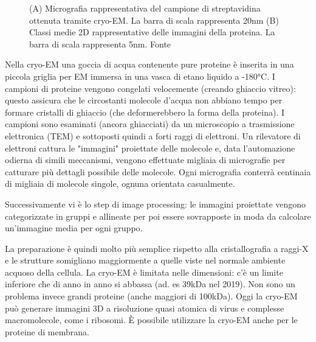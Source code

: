 {\begin{figure}[!htb]
	\caption{(A) Micrografia rappresentativa del campione di streptavidina ottenuta tramite cryo-EM. La barra di scala rappresenta 20nm (B) Classi medie 2D rappresentative delle immagini della proteina. La barra di scala rappresenta 5nm. Fonte \cite{fan2019single}}
	\label{fig:cryo-em-classi}
	\endminipage\hfill
\end{figure}

Nella cryo-EM una goccia di acqua contenente pure proteine è inserita in una piccola griglia per EM immersa in una vasca di etano liquido a -180°C. I campioni di proteine vengono congelati velocemente (creando ghiaccio vitreo): questo assicura che le circostanti molecole d'acqua non abbiano tempo per formare cristalli di ghiaccio (che deformerebbero la forma della proteina). I campioni sono esaminati (ancora ghiacciati) da un microscopio a trasmissione elettronica (TEM) e sottoposti quindi a forti raggi di elettroni. Un rilevatore di elettroni cattura le "immagini" proiettate delle molecole e, data l'automazione odierna di simili meccanismi, vengono effettuate migliaia di micrografie per catturare più dettagli possibile delle molecole. Ogni micrografia conterrà centinaia di migliaia di molecole singole, ognuna orientata casualmente. 
\par Successivamente vi è lo step di image processing: le immagini proiettate vengono categorizzate in gruppi e allineate per poi essere sovrapposte in moda da calcolare un'immagine media per ogni gruppo. \\

\par La preparazione è quindi molto più semplice rispetto alla cristallografia a raggi-X e le strutture somigliano maggiormente a quelle viste nel normale ambiente acquoso della cellula. La cryo-EM è limitata nelle dimensioni: c'è un limite inferiore che di anno in anno si abbassa (ad. es 39kDa nel 2019\supercite{fan2019single}). Non sono un problema invece grandi proteine (anche maggiori di 100kDa). Oggi la cryo-EM può generare immagini 3D a risoluzione quasi atomica di virus e complesse macromolecole, come i ribosomi. È possibile utilizzare la cryo-EM anche per le proteine di membrana. 

}
